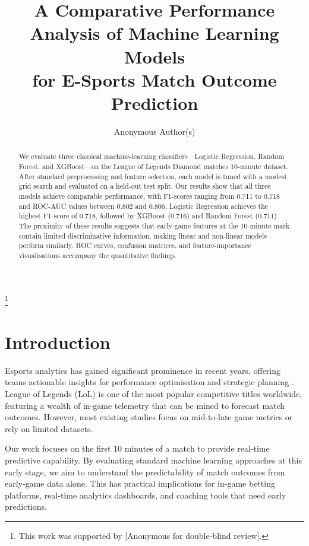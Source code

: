 \documentclass[runningheads]{llncs}
\begin{document}
\title{A Comparative Performance Analysis of Machine Learning Models\\for E-Sports Match Outcome Prediction}
\thanks{This work was supported by [Anonymous for double-blind review].}
\author{Anonymous Author(s)}
\maketitle

\begin{abstract}
We evaluate three classical machine-learning classifiers---Logistic Regression, Random Forest, and XGBoost---on the League of Legends Diamond matches 10-minute dataset. After standard preprocessing and feature selection, each model is tuned with a modest grid search and evaluated on a held-out test split. Our results show that all three models achieve comparable performance, with F1-scores ranging from 0.711 to 0.718 and ROC-AUC values between 0.802 and 0.806. Logistic Regression achieves the highest F1-score of 0.718, followed by XGBoost (0.716) and Random Forest (0.711). The proximity of these results suggests that early-game features at the 10-minute mark contain limited discriminative information, making linear and non-linear models perform similarly. ROC curves, confusion matrices, and feature-importance visualisations accompany the quantitative findings.
\end{abstract}


\section{Introduction}
Esports analytics has gained significant prominence in recent years, offering teams actionable insights for performance optimisation and strategic planning \cite{chung2020survey, park2019analyzing}. League of Legends (LoL) is one of the most popular competitive titles worldwide, featuring a wealth of in-game telemetry that can be mined to forecast match outcomes. However, most existing studies focus on mid-to-late game metrics or rely on limited datasets. 

Our work focuses on the first 10 minutes of a match to provide real-time predictive capability. By evaluating standard machine learning approaches at this early stage, we aim to understand the predictability of match outcomes from early-game data alone. This has practical implications for in-game betting platforms, real-time analytics dashboards, and coaching tools that need early predictions.
\end{document}
